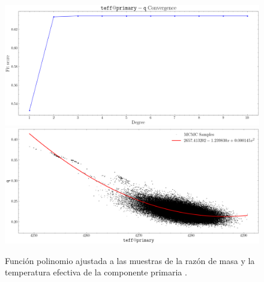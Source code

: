 \begin{figure}[!ht]
    \centering
    \includegraphics[scale=0.44]{Apendice/Figures/Figura q-teff@primary Correlacion Convergencia.png}
    \includegraphics[scale=0.44]{Apendice/Figures/Figura q-teff@primary Correlacion.png}
    \caption{Función polinomio ajustada a las muestras de la razón de masa
     y la temperatura efectiva de la componente primaria .}
\end{figure}


